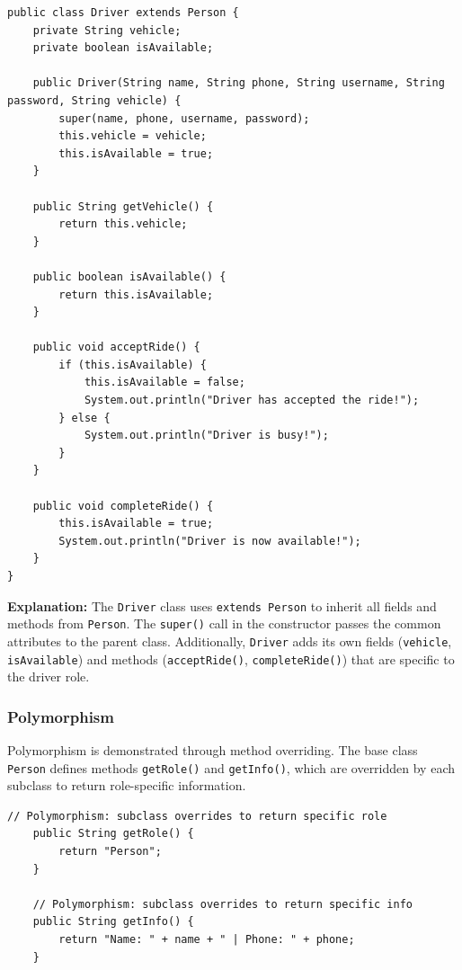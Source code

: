 \documentclass[fonts]{icst}
\begin{document}
\begin{lstlisting}[caption={Inheritance -- Driver extends Person with additional attributes}]
public class Driver extends Person { 
    private String vehicle;
    private boolean isAvailable;

    public Driver(String name, String phone, String username, String password, String vehicle) {
        super(name, phone, username, password);
        this.vehicle = vehicle;
        this.isAvailable = true;
    }

    public String getVehicle() {
        return this.vehicle;
    }

    public boolean isAvailable() {
        return this.isAvailable;
    }

    public void acceptRide() {
        if (this.isAvailable) {
            this.isAvailable = false;
            System.out.println("Driver has accepted the ride!");
        } else {
            System.out.println("Driver is busy!");
        }
    }

    public void completeRide() {
        this.isAvailable = true;
        System.out.println("Driver is now available!");
    }
}
\end{lstlisting}

\textbf{Explanation:} The \texttt{Driver} class uses \texttt{extends Person} to inherit all fields and methods from \texttt{Person}. The \texttt{super()} call in the constructor passes the common attributes to the parent class. Additionally, \texttt{Driver} adds its own fields (\texttt{vehicle}, \texttt{isAvailable}) and methods (\texttt{acceptRide()}, \texttt{completeRide()}) that are specific to the driver role.

\subsubsection{Polymorphism}

Polymorphism is demonstrated through method overriding. The base class \texttt{Person} defines methods \texttt{getRole()} and \texttt{getInfo()}, which are overridden by each subclass to return role-specific information.

\begin{lstlisting}[caption={Polymorphism in Person.java -- base methods to be overridden}]
    // Polymorphism: subclass overrides to return specific role
    public String getRole() {
        return "Person";
    }

    // Polymorphism: subclass overrides to return specific info
    public String getInfo() {
        return "Name: " + name + " | Phone: " + phone;
    }
\end{lstlisting}
\end{document}
